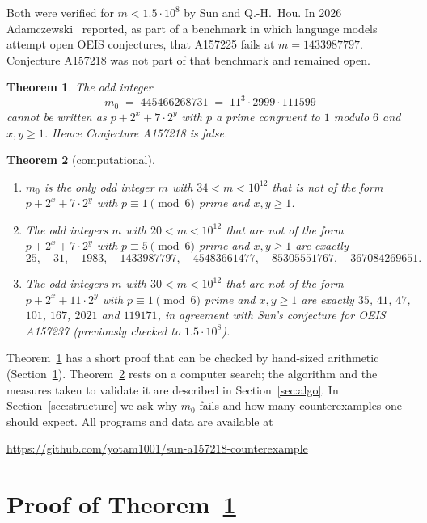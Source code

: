 \documentclass[11pt]{article}
\newtheorem{theorem}{Theorem}
\theoremstyle{definition}
\theoremstyle{remark}
\newcommand{\mz}{m_0}
\begin{document}
\medskip
Both were verified for $m<1.5\cdot 10^{8}$ by Sun and Q.-H.~Hou. In 2026 Adamczewski~\cite{oeisopen}
reported, as part of a benchmark in which language models attempt open OEIS conjectures, that
A157225 fails at $m=1433987797$. Conjecture A157218 was not part of that benchmark and remained open.

\begin{theorem}\label{thm:main}
The odd integer
\[
  \mz \;=\; 445466268731 \;=\; 11^{3}\cdot 2999\cdot 111599
\]
cannot be written as $p+2^x+7\cdot 2^y$ with $p$ a prime congruent to $1$ modulo $6$ and $x,y\ge 1$.
Hence Conjecture A157218 is false.
\end{theorem}

\begin{theorem}[computational]\label{thm:search}
\begin{enumerate}
\item[(i)] $\mz$ is the only odd integer $m$ with $34<m<10^{12}$ that is not of the form
$p+2^x+7\cdot 2^y$ with $p\equiv 1 \pmod 6$ prime and $x,y\ge 1$.
\item[(ii)] The odd integers $m$ with $20<m<10^{12}$ that are not of the form $p+2^x+7\cdot 2^y$ with
$p\equiv 5\pmod 6$ prime and $x,y\ge 1$ are exactly
\[ 25,\quad 31,\quad 1983,\quad 1433987797,\quad 45483661477,\quad 85305551767,\quad 367084269651 . \]
\item[(iii)] The odd integers $m$ with $30<m<10^{12}$ that are not of the form $p+2^x+11\cdot 2^y$ with
$p\equiv 1\pmod 6$ prime and $x,y\ge 1$ are exactly $35$, $41$, $47$, $101$, $167$, $2021$ and $119171$,
in agreement with Sun's conjecture for OEIS A157237 (previously checked to $1.5\cdot 10^{8}$).
\end{enumerate}
\end{theorem}

Theorem~\ref{thm:main} has a short proof that can be checked by hand-sized arithmetic
(Section~\ref{sec:proof}). Theorem~\ref{thm:search} rests on a computer search; the algorithm and
the measures taken to validate it are described in Section~\ref{sec:algo}. In
Section~\ref{sec:structure} we ask why $\mz$ fails and how many counterexamples one should expect.
All programs and data are available at
\begin{center}\url{https://github.com/yotam1001/sun-a157218-counterexample}\end{center}

\section{Proof of Theorem~\ref{thm:main}}\label{sec:proof}
\end{document}
